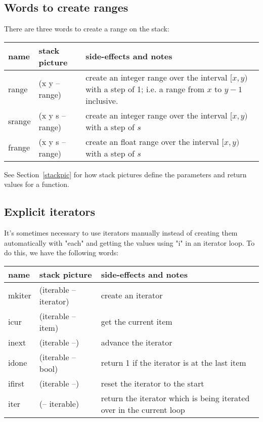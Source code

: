 \subsection{Words to create ranges}
There are three words to create a range on the stack:
\begin{center}
\begin{tabular}{|l|l|p{4in}|}\hline
\textbf{name} & \textbf{stack picture} & \textbf{side-effects and notes}\\ \hline
range & (x y -- range) & create an integer range over the interval $[x,y)$ with a step of 1; i.e. a range from $x$ to $y-1$ inclusive.\\
srange & (x y s -- range) &  create an integer range over the interval $[x,y)$ with a step of $s$\\
frange & (x y s -- range) &  create an float range over the interval $[x,y)$ with a step of $s$\\
\hline
\end{tabular}
\end{center}
See Section~\ref{stackpic} for how stack pictures define the parameters
and return values for a function.

\subsection{Explicit iterators}
It's sometimes necessary to use iterators manually instead of creating
them automatically with "each" and getting the values using "i" in an
iterator loop.
To do this, we have the following words:
\begin{center}
\begin{tabular}{|l|l|p{4in}|}\hline
\textbf{name} & \textbf{stack picture} & \textbf{side-effects and notes}\\ \hline
mkiter & (iterable -- iterator) & create an iterator\\
icur & (iterable -- item) & get the current item\\
inext & (iterable --) & advance the iterator\\
idone & (iterable -- bool) & return 1 if the iterator is at the last item\\
ifirst & (iterable --) & reset the iterator to the start\\
iter & (-- iterable) & return the iterator which is being iterated over in
the current loop\\
\hline
\end{tabular}
\end{center}


